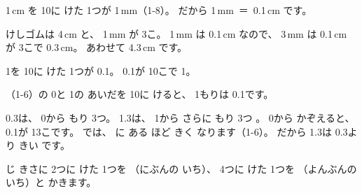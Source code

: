 
\label{bk:1-16:monosashi}1\,cm を 10に けた 1つが 1\,mm（1-8）。 だから \mbox{1\,mm ＝ 0.1\,cm} です。

\begin{bkfigure}
\end{bkfigure}
\vspace{2.5mm}
\noindent けしゴムは 4\,cm と、 1\,mm が 3こ。 1\,mm は 0.1\,cm なので、 3\,mm は 0.1\,cm が 3こで 0.3\,cm。 あわせて 4.3\,cm です。

\begin{taisetsu}
1を 10に けた 1つが 0.1。 0.1が 10こで 1。
\end{taisetsu}


\label{bk:1-16:suuchokusen}\mbox{}（1-6）の 0と 1の あいだを 10に けると、 \mbox{1}もりは 0.1です。

\begin{bkfigure}
\end{bkfigure}
\noindent 0.3は、 0から もり 3つ。 1.3は、 1から さらに もり 3つ 。 0から かぞえると、 0.1が 13こです。 では、 に ある ほど きく なります（1-6）。 だから 1.3は 0.3より きい です。


\label{bk:1-16:bunsuu}じ きさに 2つに けた 1つを （にぶんの いち）、 4つに けた 1つを （よんぶんの いち）と かきます。

